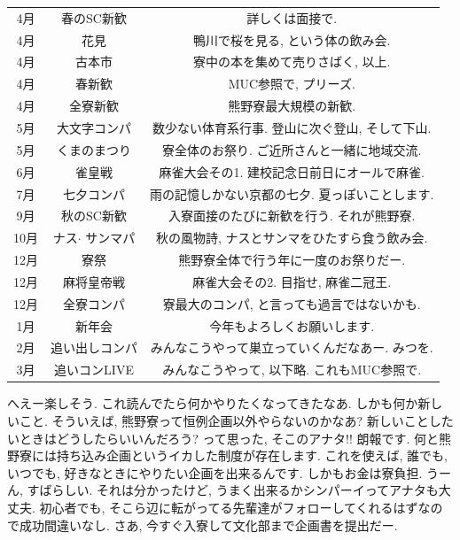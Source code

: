 \documentclass[10pt,b5jsbook,dvips,dvipdfmx,openany]{jsbook}
\theoremstyle{definition}
\begin{document}
\begin{table}[htb]
  \begin{tabular}{|c||c|c|} \hline
	4月	& 春のSC新歓		& 詳しくは面接で.   \\
    4月						& 花見			& 鴨川で桜を見る, という体の飲み会.  \\
     4月 						& 古本市			& 寮中の本を集めて売りさばく, 以上. \\
    4月	  					& 春新歓			& MUC参照で, プリーズ.   \\  %
     4月 						& 全寮新歓		& 熊野寮最大規模の新歓.  \\ \hline
	5月	& 大文字コンパ	& 数少ない体育系行事. 登山に次ぐ登山, そして下山.  \\
		5月				& くまのまつり	& 寮全体のお祭り. ご近所さんと一緒に地域交流.  \\ \hline
			6月			& 雀皇戦			& 麻雀大会その1. 建校記念日前日にオールで麻雀.  \\ \hline
			7月			& 七夕コンパ		& 雨の記憶しかない京都の七夕. 夏っぽいことします.  \\ \hline
			9月			& 秋のSC新歓		& 入寮面接のたびに新歓を行う. それが熊野寮.  \\ \hline
			10月			& ナス$ \cdot $ サンマパ	& 秋の風物詩, ナスとサンマをひたすら食う飲み会.  \\ \hline
	12月	& 寮祭			& 熊野寮全体で行う年に一度のお祭りだー.  \\
		12月				& 麻将皇帝戦		& 麻雀大会その2. 目指せ, 麻雀二冠王. \\
	12月					& 全寮コンパ		& 寮最大のコンパ, と言っても過言ではないかも.  \\ \hline
			1月			& 新年会			& 今年もよろしくお願いします. \\ \hline
			2月			& 追い出しコンパ	& みんなこうやって巣立っていくんだなあー. みつを.  \\ \hline
			3月			& 追いコンLIVE	& みんなこうやって, 以下略. これもMUC参照で.  \\ \hline
  \end{tabular}
\end{table}

 		へえー楽しそう. これ読んでたら何かやりたくなってきたなあ. しかも何か新しいこと. そういえば, 熊野寮って恒例企画以外やらないのかなあ?  新しいことしたいときはどうしたらいいんだろう?  って思った, そこのアナタ!!  朗報です. 何と熊野寮には持ち込み企画というイカした制度が存在します. これを使えば, 誰でも, いつでも, 好きなときにやりたい企画を出来るんです. しかもお金は寮負担. うーん, すばらしい. それは分かったけど, うまく出来るかシンパーイってアナタも大丈夫. 初心者でも, そこら辺に転がってる先輩達がフォローしてくれるはずなので成功間違いなし. さあ, 今すぐ入寮して文化部まで企画書を提出だー.
\end{document}
